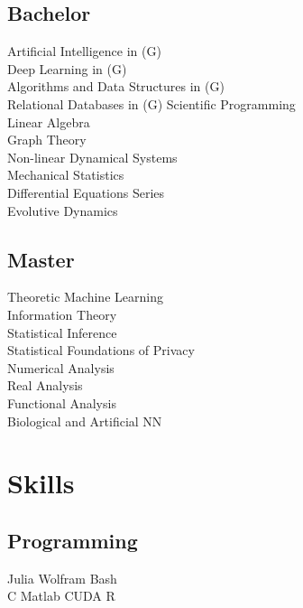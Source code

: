 \documentclass[]{deedy-resume-openfont}
\begin{document}
\begin{minipage}[t]{0.32\textwidth}
\subsection{Bachelor}
Artificial Intelligence in  (G)\\
Deep Learning in (G)\\
Algorithms and Data Structures in  (G)\\
Relational Databases in  (G)
Scientific Programming \\
Linear Algebra\\
Graph Theory \\
Non-linear Dynamical Systems \\
Mechanical Statistics \\
Differential Equations Series\\
Evolutive Dynamics \\

\sectionsep

\subsection{Master}
Theoretic Machine Learning\\
Information Theory\\
Statistical Inference\\
Statistical Foundations of Privacy\\
Numerical Analysis \\
Real Analysis\\
Functional Analysis\\
Biological and Artificial NN \\



\section{Skills}
\subsection{Programming}
 \textbullet{} Julia \textbullet{} Wolfram \textbullet{} Bash \\ 
C \textbullet{} Matlab  \textbullet{} CUDA \textbullet{} R 
\sectionsep


\end{minipage}
\end{document}
